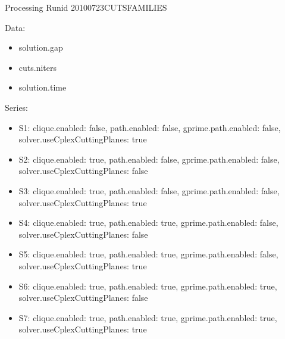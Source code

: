 \documentclass[landscape, 12pt]{report}
\begin{document}
	Processing Runid 20100723CUTSFAMILIES

	Data:
	\begin{itemize}
	\item solution.gap
	\item cuts.niters
	\item solution.time
	\end{itemize}
	Series:
	\begin{itemize}
	\item S1: clique.enabled: false, path.enabled: false, gprime.path.enabled: false, solver.useCplexCuttingPlanes: true
	\item S2: clique.enabled: true, path.enabled: false, gprime.path.enabled: false, solver.useCplexCuttingPlanes: false
	\item S3: clique.enabled: true, path.enabled: false, gprime.path.enabled: false, solver.useCplexCuttingPlanes: true
	\item S4: clique.enabled: true, path.enabled: true, gprime.path.enabled: false, solver.useCplexCuttingPlanes: false
	\item S5: clique.enabled: true, path.enabled: true, gprime.path.enabled: false, solver.useCplexCuttingPlanes: true
	\item S6: clique.enabled: true, path.enabled: true, gprime.path.enabled: true, solver.useCplexCuttingPlanes: false
	\item S7: clique.enabled: true, path.enabled: true, gprime.path.enabled: true, solver.useCplexCuttingPlanes: true
	\end{itemize}
\end{document}
